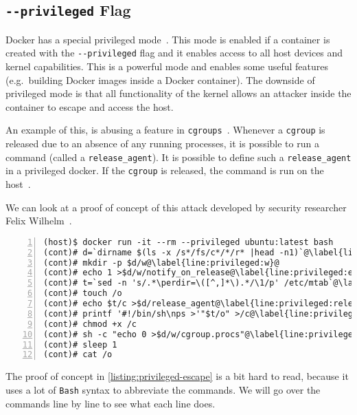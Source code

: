 \subsection{\texorpdfstring{\lstinline{--privileged}}{--privileged} Flag}\label{subsection:privileged}

Docker has a special privileged mode~\cite{Docker-in-Docker-blog}. This mode is enabled if a container is created with the \lstinline{--privileged} flag and it enables access to all host devices and kernel capabilities. This is a powerful mode and enables some useful features (e.g.\ building Docker images inside a Docker container). The downside of privileged mode is that all functionality of the kernel allows an attacker inside the container to escape and access the host.

\medskip

An example of this, is abusing a feature in \lstinline{cgroups}~\cite{CGroup-Docs}. Whenever a \lstinline{cgroup} is released due to an absence of any running processes, it is possible to run a command (called a \lstinline{release_agent}). It is possible to define such a \lstinline{release_agent} in a privileged docker. If the \lstinline{cgroup} is released, the command is run on the host~\cite{TrailOfBits-Docker-Escape}.

\medskip

We can look at a proof of concept of this attack developed by security researcher Felix Wilhelm~\cite{Felix-Wilhem-Tweet}.
\begin{lstlisting}[numbers=left, escapechar=@, caption={Privileged container escape using \lstinline{cgroups}.},captionpos=b,label={listing:privileged-escape}]
(host)$ docker run -it --rm --privileged ubuntu:latest bash
(cont)# d=`dirname $(ls -x /s*/fs/c*/*/r* |head -n1)`@\label{line:privileged:d}@
(cont)# mkdir -p $d/w@\label{line:privileged:w}@
(cont)# echo 1 >$d/w/notify_on_release@\label{line:privileged:enable_release_agent}@
(cont)# t=`sed -n 's/.*\perdir=\([^,]*\).*/\1/p' /etc/mtab`@\label{line:privileged:t}@
(cont)# touch /o
(cont)# echo $t/c >$d/release_agent@\label{line:privileged:release_agent}@
(cont)# printf '#!/bin/sh\nps >'"$t/o" >/c@\label{line:privileged:c}@
(cont)# chmod +x /c
(cont)# sh -c "echo 0 >$d/w/cgroup.procs"@\label{line:privileged:procs}@
(cont)# sleep 1
(cont)# cat /o
\end{lstlisting}

The proof of concept in \autoref{listing:privileged-escape} is a bit hard to read, because it uses a lot of \lstinline{Bash} syntax to abbreviate the commands. We will go over the commands line by line to see what each line does.

